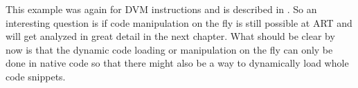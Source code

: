 This example was again for DVM instructions and is described in \parencite{code_protection}. So an interesting question is if code manipulation on the fly
is still possible at ART and will get analyzed in great detail in the next chapter.
What should be clear by now is that the dynamic code loading or manipulation on the
fly can only be done in native code so that there might also be a way to dynamically
load whole code snippets.
